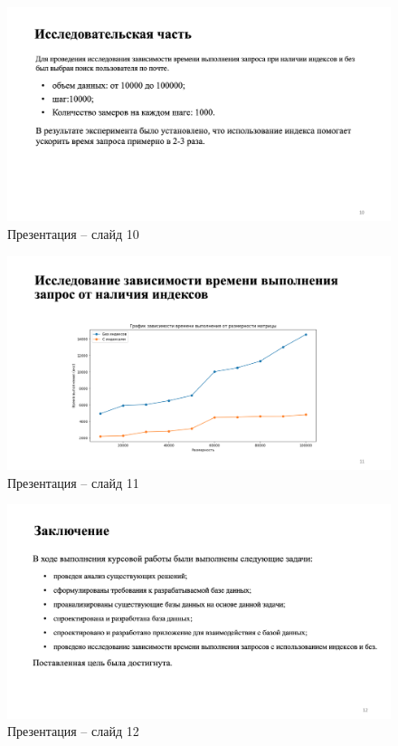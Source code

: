 \begin{figure}[H]
    \includegraphics[width=1\linewidth]{img/10.png}
    \caption{Презентация -- слайд 10}
\end{figure}
\noindent

\begin{figure}[H]
    \includegraphics[width=1\linewidth]{img/11.png}
    \caption{Презентация -- слайд 11}
\end{figure}
\noindent

\begin{figure}[H]
    \includegraphics[width=1\linewidth]{img/12.png}
    \caption{Презентация -- слайд 12}
\end{figure}
\noindent
